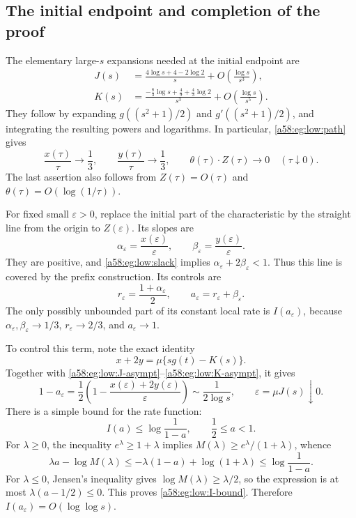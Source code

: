 \documentclass[11pt,letterpaper]{article}
\theoremstyle{remark}
\newcommand{\muval}{\mu}
\begin{document}
\subsection{The initial endpoint and completion of the proof}

The elementary large-\(s\) expansions needed at the initial endpoint are
\begin{align}
 J(s)&=\frac{4\log s+4-2\log2}{s}
       +O\!\left(\frac{\log s}{s^3}\right), \label{a58:eg:low:J-asympt}\\
 K(s)&=\frac{-\frac83\log s+\frac49+\frac43\log2}{s^3}
       +O\!\left(\frac{\log s}{s^5}\right). \label{a58:eg:low:K-asympt}
\end{align}
They follow by expanding \(g((s^2+1)/2)\) and
\(g'((s^2+1)/2)\), and integrating the resulting powers and logarithms.
In particular, \eqref{a58:eg:low:path} gives
\begin{equation}\label{a58:eg:low:initial-ratios}
 \frac{x(\tau)}{\tau}\longrightarrow\frac13,\qquad
 \frac{y(\tau)}{\tau}\longrightarrow\frac13,\qquad
 \theta(\tau)\cdot Z(\tau)\longrightarrow0
 \quad(\tau\downarrow0).
\end{equation}
The last assertion also follows from
\(Z(\tau)=O(\tau)\) and \(\theta(\tau)=O(\log(1/\tau))\).

For fixed small \(\varepsilon>0\), replace the initial part of the
characteristic by the straight line from the origin to
\(Z(\varepsilon)\). Its slopes are
\[
 \alpha_\varepsilon=\frac{x(\varepsilon)}{\varepsilon},
 \qquad
 \beta_\varepsilon=\frac{y(\varepsilon)}{\varepsilon}.
\]
They are positive, and \eqref{a58:eg:low:slack} implies
\(\alpha_\varepsilon+2\beta_\varepsilon<1\).
Thus this line is covered by the prefix construction.
Its controls are
\[
 r_\varepsilon=\frac{1+\alpha_\varepsilon}{2},
 \qquad a_\varepsilon=r_\varepsilon+\beta_\varepsilon.
\]
The only possibly unbounded part of its constant local rate is
\(I(a_\varepsilon)\), because
\(\alpha_\varepsilon,\beta_\varepsilon\to1/3\),
\(r_\varepsilon\to2/3\), and \(a_\varepsilon\to1\).

To control this term, note the exact identity
\[
 x+2y=\muval\{s g(t)-K(s)\}.
\]
Together with \eqref{a58:eg:low:J-asympt}--\eqref{a58:eg:low:K-asympt}, it gives
\begin{equation}\label{a58:eg:low:line-gap}
 1-a_\varepsilon
 =\frac12\left(1-\frac{x(\varepsilon)+2y(\varepsilon)}
                         {\varepsilon}\right)
 \sim\frac1{2\log s},
 \qquad \varepsilon=\muval J(s)\downarrow0.
\end{equation}
There is a simple bound for the rate function:
\begin{equation}\label{a58:eg:low:I-bound}
 I(a)\le \log\frac1{1-a},\qquad \frac12\le a<1.
\end{equation}
For \(\lambda\ge0\), the inequality \(e^\lambda\ge1+\lambda\)
implies \(M(\lambda)\ge e^\lambda/(1+\lambda)\), whence
\[
 \lambda a-\log M(\lambda)
 \le-\lambda(1-a)+\log(1+\lambda)
 \le\log\frac1{1-a}.
\]
For \(\lambda\le0\), Jensen's inequality gives
\(\log M(\lambda)\ge\lambda/2\), so the expression is at most
\(\lambda(a-1/2)\le0\). This proves \eqref{a58:eg:low:I-bound}.
Therefore \(I(a_\varepsilon)=O(\log\log s)\).
\end{document}
